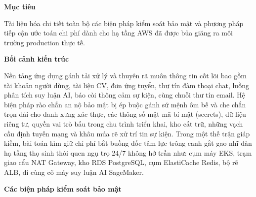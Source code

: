 \vspace{0.5em}\noindent\textbf{Mục tiêu}\par

Tài liệu hóa chi tiết toàn bộ các biện pháp kiểm soát bảo mật và phương
pháp tiếp cận ước toán chi phí dành cho hạ tầng AWS đã được bủa giăng ra
môi trường production thực tế.

\vspace{0.5em}\noindent\textbf{Bối cảnh kiến
trúc}\par

Nền tảng ứng dụng gánh tải xử lý và thuyên rã muôn thông tin cốt lõi bao
gồm tài khoản người dùng, tài liệu CV, đơn ứng tuyển, thư tín đàm thoại
chat, luồng phân tích suy luận AI, báo còi thông cảm sự kiện, cùng chuỗi
thư tín email. Hệ biện pháp rào chắn an nộ bảo mật bị ép buộc gánh sứ
mệnh ôm bế và che chắn trọn dải cho danh xưng xác thực, các thông số mật
mã bí mật (secrets), dữ liệu riêng tư, quyền vai trò bấu trong chu trình
triển khai, kho cất trữ, những vạch cầu định tuyến mạng và khâu múa rẽ
xử trí tin sự kiện. Trong một thế trận giáp kiềm, bài toán kìm giữ chi
phí bắt buồng dốc tâm lực trông canh gắt gao nhĩ đàn hạ tầng thọ sinh
thói quen ngụ trọ 24/7 không hở trần như: cụm máy EKS, trạm giao cẩu NAT
Gateway, kho RDS PostgreSQL, cụm ElastiCache Redis, bộ rẽ ALB, đi cùng
cõ máy suy luận AI SageMaker.

\vspace{0.5em}\noindent\textbf{Các biện pháp kiểm soát bảo
mật}\par

